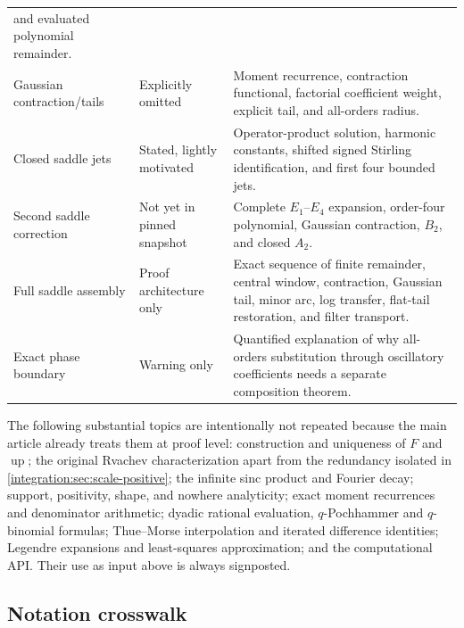 \documentclass[11pt,oneside]{article}
\theoremstyle{definition}
\theoremstyle{remark}
\newcommand{\Up}{\operatorname{up}}
\begin{document}
\begin{longtable}{@{}p{}p{}p{}@{}}
and evaluated polynomial remainder.\\
Gaussian contraction/tails & Explicitly omitted & Moment recurrence, contraction functional,
factorial coefficient weight, explicit tail, and all-orders radius.\\
Closed saddle jets & Stated, lightly motivated & Operator-product solution, harmonic constants,
shifted signed Stirling identification, and first four bounded jets.\\
Second saddle correction & Not yet in pinned snapshot & Complete $E_1$--$E_4$ expansion,
order-four polynomial, Gaussian contraction, $B_2$, and closed $A_2$.\\
Full saddle assembly & Proof architecture only & Exact sequence of finite remainder, central
window, contraction, Gaussian tail, minor arc, log transfer, flat-tail restoration, and filter
transport.\\
Exact phase boundary & Warning only & Quantified explanation of why all-orders substitution
through oscillatory coefficients needs a separate composition theorem.\\
\bottomrule
\end{longtable}
\endgroup

The following substantial topics are intentionally not repeated because the main article
already treats them at proof level: construction and uniqueness of $F$ and $\Up$; the original
Rvachev characterization apart from the redundancy isolated in \cref{integration:sec:scale-positive}; the infinite sinc product and Fourier decay; support, positivity,
shape, and nowhere analyticity; exact moment recurrences and denominator arithmetic; dyadic
rational evaluation, $q$-Pochhammer and $q$-binomial formulas; Thue--Morse interpolation and
iterated difference identities; Legendre expansions and least-squares approximation; and the
computational API.  Their use as input above is always signposted.

\subsection{Notation crosswalk}
\label{integration:app:notation}
\end{document}
